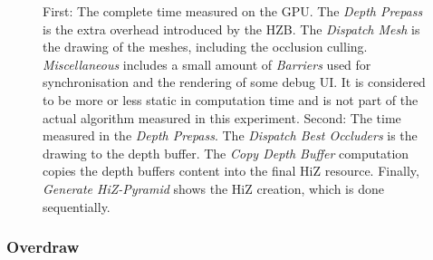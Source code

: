 \begin{figure}[!htb]
  \caption{First: The complete time measured on the \ac{GPU}. The \emph{Depth Prepass} is the extra overhead 
  introduced by the \ac{HZB}. The \emph{Dispatch Mesh} is the drawing of the meshes, including the occlusion 
  culling. \emph{Miscellaneous} includes a small amount of \emph{Barriers} used for synchronisation and the 
  rendering of some debug \ac{UI}. It is considered to be more or less static in computation time and is not 
  part of the actual algorithm measured in this experiment. Second: The time measured in the \emph{Depth Prepass}. 
  The \emph{Dispatch Best Occluders} is the drawing to the depth buffer. The \emph{Copy Depth Buffer} computation 
  copies the depth buffers content into the final \ac{HiZ} resource. Finally, \emph{Generate HiZ-Pyramid} shows 
  the \ac{HiZ} creation, which is done sequentially.}
  \label{fig:torus-gpu-results}
\end{figure}

\subsubsection*{Overdraw}

